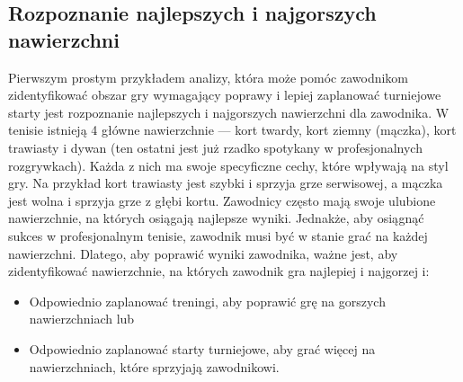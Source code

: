 \documentclass[12pt, a4paper]{article}
\begin{document}



\subsection{Rozpoznanie najlepszych i najgorszych nawierzchni}
Pierwszym prostym przykładem analizy, która może pomóc zawodnikom zidentyfikować obszar gry wymagający poprawy i lepiej zaplanować turniejowe starty jest rozpoznanie najlepszych i najgorszych nawierzchni dla zawodnika. W tenisie istnieją 4 główne nawierzchnie --- kort twardy, kort ziemny (mączka), kort trawiasty i dywan (ten ostatni jest już rzadko spotykany w profesjonalnych rozgrywkach). Każda z nich ma swoje specyficzne cechy, które wpływają na styl gry. Na przykład kort trawiasty jest szybki i sprzyja grze serwisowej, a mączka jest wolna i sprzyja grze z głębi kortu. Zawodnicy często mają swoje ulubione nawierzchnie, na których osiągają najlepsze wyniki. Jednakże, aby osiągnąć sukces w profesjonalnym tenisie, zawodnik musi być w stanie grać na każdej nawierzchni. Dlatego, aby poprawić wyniki zawodnika, ważne jest, aby zidentyfikować nawierzchnie, na których zawodnik gra najlepiej i najgorzej i:
\begin{itemize}
    \item Odpowiednio zaplanować treningi, aby poprawić grę na gorszych nawierzchniach lub
    \item Odpowiednio zaplanować starty turniejowe, aby grać więcej na nawierzchniach, które sprzyjają zawodnikowi.
\end{itemize}
\end{document}
